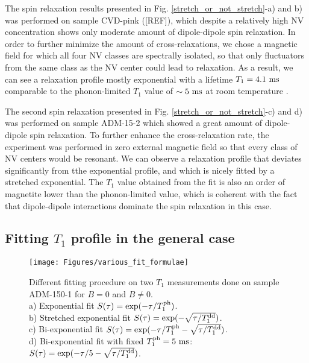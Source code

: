 \documentclass[a4paper,11pt]{report}
\begin{document}
The spin relaxation results presented in Fig. \ref{stretch_or_not_stretch}-a) and b) was performed on sample CVD-pink ([REF]), which despite a relatively high NV concentration shows only moderate amount of dipole-dipole spin relaxation. In order to further minimize the amount of cross-relaxations, we chose a magnetic field for which all four NV classes are spectrally isolated, so that only fluctuators from the same class as the NV center could lead to relaxation. As a result, we can see a relaxation profile mostly exponential with a lifetime $T_1=4.1\ \rm ms$ comparable to the phonon-limited $T_1$ value of $\sim 5\ \rm ms$ at room temperature \citep{jarmola2012temperature}.

The second spin relaxation presented in Fig. \ref{stretch_or_not_stretch}-c) and d) was performed on sample ADM-15-2 which showed a great amount of dipole-dipole spin relaxation. To further enhance the cross-relaxation rate, the experiment was performed in zero external magnetic field so that every class of NV centers would be resonant. We can observe a relaxation profile that deviates significantly from tthe exponential profile, and which is nicely fitted by a stretched exponential. The $T_1$ value obtained from the fit is also an order of magnetite lower than the phonon-limited value, which is coherent with the fact that dipole-dipole interactions dominate the spin relaxation in this case.

\subsection{Fitting $T_1$ profile in the general case}

\begin{figure}[h]
\centering
\texttt{[image: Figures/various\_fit\_formulae]}
\caption{Different fitting procedure on two $T_1$ measurements done on sample ADM-150-1 for $B=0$ and $B\neq0$. \\ a) Exponential fit $S(\tau)=\exp (-\tau/T_1^{\rm ph})$. \\ b) Stretched exponential fit $S(\tau)=\exp (-\sqrt{\tau/T_1^{\rm dd}})$. \\ c) Bi-exponential fit $S(\tau)=\exp (-\tau/T_1^{\rm ph} -\sqrt{\tau/T_1^{\rm dd}})$. \\ d) Bi-exponential fit with fixed $T_1^{\rm ph}=5\ \rm ms$: $S(\tau)=\exp (-\tau/5 -\sqrt{\tau/T_1^{\rm dd}})$.}
\label{various_fit_formulae}
\end{figure}
\end{document}
